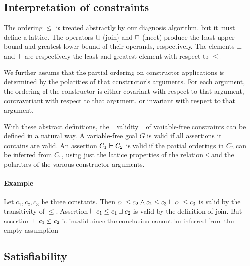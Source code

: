 
\subsection{Interpretation of constraints}

The ordering $\leq$ is treated abstractly by our diagnosis algorithm,
but it must define a lattice. The operators $\sqcup$ (join) and $\sqcap$
(meet) produce the least upper bound and greatest lower bound
of their operands, respectively.
%
The elements $\bot$ and $\top$ are respectively the least and greatest
element with respect to $\leq$.

We further assume that the partial ordering on constructor applications
is determined by the polarities of that constructor's arguments.
For each argument, the ordering of the constructor is either
covariant with respect to that argument, contravariant with respect
to that argument, or invariant with respect to that argument.

With these abstract definitions, the _validity_ of variable-free constraints can be defined
in a natural way. A variable-free goal $G$ is valid if all assertions it contains are valid.
An assertion $C_1 \vdash C_2$ is valid if
the partial orderings in $C_2$ can be inferred from $C_1$, using just
the lattice properties of the relation ≤ and the polarities of the
various constructor arguments.

\paragraph{Example}

Let $c_1, c_2, c_3$ be three constants. Then $c_1 \leq c_2 \land c_2 \leq c_3
\vdash c_1 \leq c_3$ is valid by the transitivity of $\leq$. Assertion
$\vdash c_1 \leq c_1 \sqcup c_2$ is valid by the definition of join. But
assertion $\vdash c_1\leq c_2$ is invalid since the
conclusion cannot be inferred from the empty assumption.

\subsection{Satisfiability}

